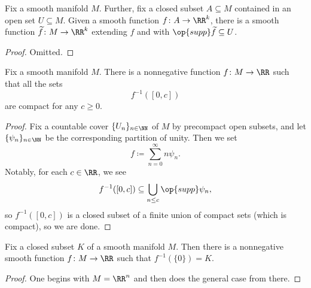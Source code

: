 \documentclass[../notes.tex]{subfiles}
\begin{document}
\begin{corollary}
	Fix a smooth manifold $M$. Further, fix a closed subset $A\subseteq M$ contained in an open set $U\subseteq M$. Given a smooth function $f\colon A\to\RR^k$, there is a smooth function $\widetilde f\colon M\to\RR^k$ extending $f$ and with $\op{supp}\widetilde f\subseteq U$.
\end{corollary}
\begin{proof}
	Omitted.
\end{proof}
\begin{corollary}
	Fix a smooth manifold $M$. There is a nonnegative function $f\colon M\to\RR$ such that all the sets
	\[f^{-1}([0,c])\]
	are compact for any $c\ge0$.
\end{corollary}
\begin{proof}
	Fix a countable cover $\{U_n\}_{n\in\NN}$ of $M$ by precompact open subsets, and let $\{\psi_n\}_{n\in\NN}$ be the corresponding partition of unity. Then we set
	\[f\coloneqq\sum_{n=0}^\infty n\psi_n.\]
	Notably, for each $c\in\RR$, we see
	\[f^{-1}([0,c])\subseteq\bigcup_{n\le c}\op{supp}\psi_n,\]
	so $f^{-1}([0,c])$ is a closed subset of a finite union of compact sets (which is compact), so we are done.
\end{proof}
\begin{corollary}
	Fix a closed subset $K$ of a smooth manifold $M$. Then there is a nonnegative smooth function $f\colon M\to\RR$ such that $f^{-1}(\{0\})=K$.
\end{corollary}
\begin{proof}
	One begins with $M=\RR^n$ and then does the general case from there.
\end{proof}
\end{document}
